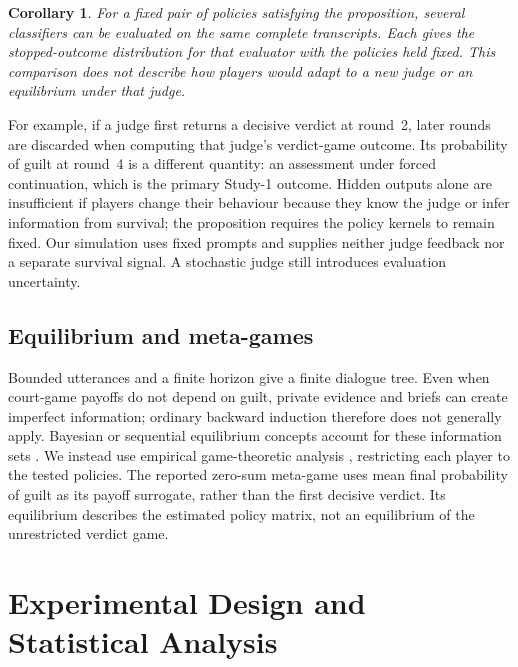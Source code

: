 \documentclass[10pt,a4paper]{article}
\newtheorem{corollary}{Corollary}
\theoremstyle{remark}
\begin{document}
\begin{corollary}
For a fixed pair of policies satisfying the proposition, several classifiers can be evaluated on the same complete
transcripts. Each gives the stopped-outcome distribution for that evaluator with the policies held fixed. This
comparison does not describe how players would adapt to a new judge or an equilibrium under that judge.
\end{corollary}
\noindent For example, if a judge first returns a decisive verdict at round~2, later rounds are discarded when
computing that judge's verdict-game outcome. Its probability of guilt at round~4 is a different quantity: an
assessment under forced continuation, which is the primary Study-1 outcome. Hidden outputs alone are insufficient
if players change their behaviour because they know the judge or infer information from survival; the proposition
requires the policy kernels to remain fixed. Our simulation uses fixed prompts and supplies neither judge feedback
nor a separate survival signal. A stochastic judge still introduces evaluation uncertainty.

\subsection{Equilibrium and meta-games}
Bounded utterances and a finite horizon give a finite dialogue tree. Even when court-game
payoffs do not depend on guilt, private evidence and briefs can create imperfect information; ordinary backward
induction therefore does not generally apply. Bayesian or sequential equilibrium concepts account for these
information sets \citep{tadelis2013}. We instead use empirical game-theoretic analysis \citep{wellman2006},
restricting each player to the tested policies. The reported zero-sum meta-game uses mean final probability of guilt
as its payoff surrogate, rather than the first decisive verdict. Its equilibrium describes the estimated policy
matrix, not an equilibrium of the unrestricted verdict game.

\section{Experimental Design and Statistical Analysis}\label{sec:causal}
\end{document}
